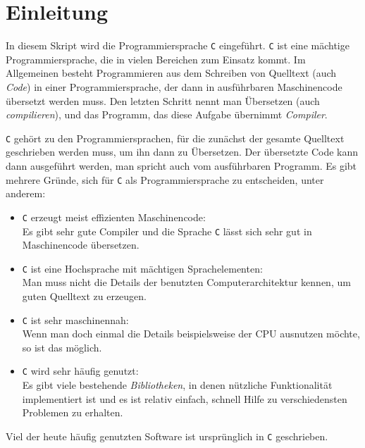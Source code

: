 \section{Einleitung}

In diesem Skript wird die Programmiersprache \texttt{C} eingeführt. 
\texttt{C} ist eine m\"{a}chtige Programmiersprache, die in vielen Bereichen zum Einsatz kommt.
Im Allgemeinen besteht Programmieren aus dem Schreiben von Quelltext (auch \emph{Code}) in einer Programmiersprache, der dann in ausführbaren Maschinencode übersetzt werden muss. 
Den letzten Schritt nennt man Übersetzen (auch \emph{compilieren}), und das Programm, das diese Aufgabe übernimmt \emph{Compiler}.

\texttt{C} gehört zu den Programmiersprachen, für die zunächst der gesamte Quelltext geschrieben werden muss, um ihn dann zu Übersetzen. 
Der übersetzte Code kann dann ausgeführt werden, man spricht auch vom ausführbaren Programm.
Es gibt mehrere Gründe, sich für \texttt{C} als Programmiersprache zu entscheiden, unter anderem:
\begin{itemize}
\item \texttt{C} erzeugt meist effizienten Maschinencode:\\
  Es gibt sehr gute Compiler und die Sprache \texttt{C} lässt sich sehr gut in Maschinencode übersetzen.
\item \texttt{C} ist eine Hochsprache mit mächtigen Sprachelementen:\\
  Man muss nicht die Details der benutzten Computerarchitektur kennen, um guten Quelltext zu erzeugen.
\item \texttt{C} ist sehr maschinennah:\\
  Wenn man doch einmal die Details beispielsweise der CPU ausnutzen möchte, so ist das möglich.
\item \texttt{C} wird sehr häufig genutzt:\\
  Es gibt viele bestehende \emph{Bibliotheken}, in denen nützliche Funktionalität implementiert ist und es ist relativ einfach, schnell Hilfe zu verschiedensten Problemen zu erhalten.
\end{itemize}
Viel der heute häufig genutzten Software ist ursprünglich in \texttt{C} geschrieben.

